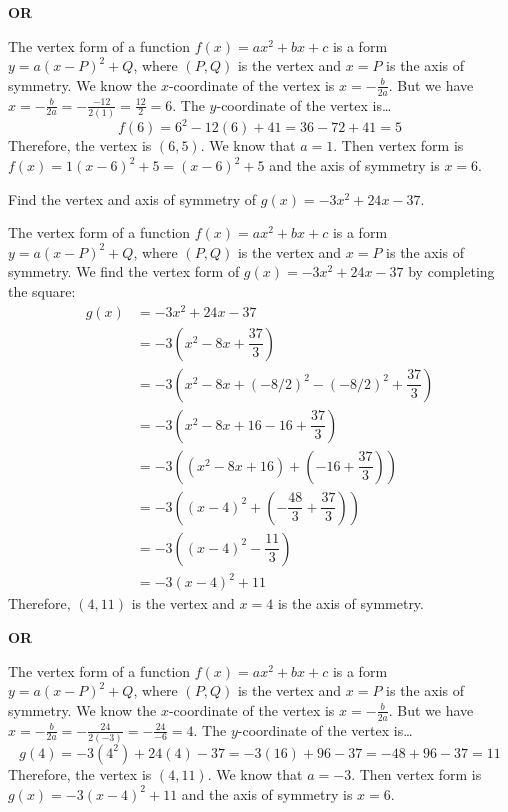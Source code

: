 \documentclass[11pt,letterpaper]{article}
\begin{document}
\begin{center} {\bfseries OR} \end{center}

The vertex form of a function $f(x)= ax^2 + bx + c$ is a form $y= a(x - P)^2 + Q$, where $(P, Q)$ is the vertex and $x= P$ is the axis of symmetry. We know the $x$-coordinate of the vertex is $x= -\frac{b}{2a}$. But we have $x= -\frac{b}{2a}= -\frac{-12}{2(1)}= \frac{12}{2}= 6$. The $y$-coordinate of the vertex is\dots \pspace
	\[
	f(6)= 6^2 - 12(6) + 41= 36 - 72 + 41= 5
	\] \pspace
Therefore, the vertex is $(6, 5)$. We know that $a= 1$. Then vertex form is $f(x)= 1(x - 6)^2 + 5= (x - 6)^2 + 5$ and the axis of symmetry is $x= 6$. 



\newpage



 Find the vertex and axis of symmetry of $g(x)= -3x^2 + 24x - 37$. \pspace

\sol The vertex form of a function $f(x)= ax^2 + bx + c$ is a form $y= a(x - P)^2 + Q$, where $(P, Q)$ is the vertex and $x= P$ is the axis of symmetry. We find the vertex form of $g(x)= -3x^2 + 24x - 37$ by completing the square: \pspace
	\[
	\begin{aligned}
	g(x)&= -3x^2 + 24x - 37 \\[0.3cm]
	&= -3 \left( x^2 - 8x + \dfrac{37}{3} \right) \\[0.3cm]
	&= -3 \left( x^2 - 8x + (-8/2)^2 - (-8/2)^2 + \dfrac{37}{3} \right) \\[0.3cm]
	&= -3 \left( x^2 - 8x + 16 - 16 + \dfrac{37}{3} \right) \\[0.3cm]
	&= -3 \left( (x^2 - 8x + 16) + \left( -16 + \dfrac{37}{3} \right) \right) \\[0.3cm]
	&= -3 \left( (x - 4)^2 + \left( -\dfrac{48}{3} + \dfrac{37}{3} \right) \right) \\[0.3cm]
	&= -3 \left( (x - 4)^2 - \dfrac{11}{3} \right) \\[0.3cm]
	&= -3(x - 4)^2 + 11
	\end{aligned}
	\] \pspace
Therefore, $(4, 11)$ is the vertex and $x= 4$ is the axis of symmetry. \pspace

\begin{center} {\bfseries OR} \end{center}

The vertex form of a function $f(x)= ax^2 + bx + c$ is a form $y= a(x - P)^2 + Q$, where $(P, Q)$ is the vertex and $x= P$ is the axis of symmetry. We know the $x$-coordinate of the vertex is $x= -\frac{b}{2a}$. But we have $x= -\frac{b}{2a}= -\frac{24}{2(-3)}= -\frac{24}{-6}= 4$. The $y$-coordinate of the vertex is\dots \pspace
	\[
	g(4)= -3(4^2) + 24(4) - 37= -3(16) + 96 - 37= -48 + 96 - 37= 11
	\] \pspace
Therefore, the vertex is $(4, 11)$. We know that $a= -3$. Then vertex form is $g(x)= -3(x - 4)^2 + 11$ and the axis of symmetry is $x= 6$. 
\end{document}
